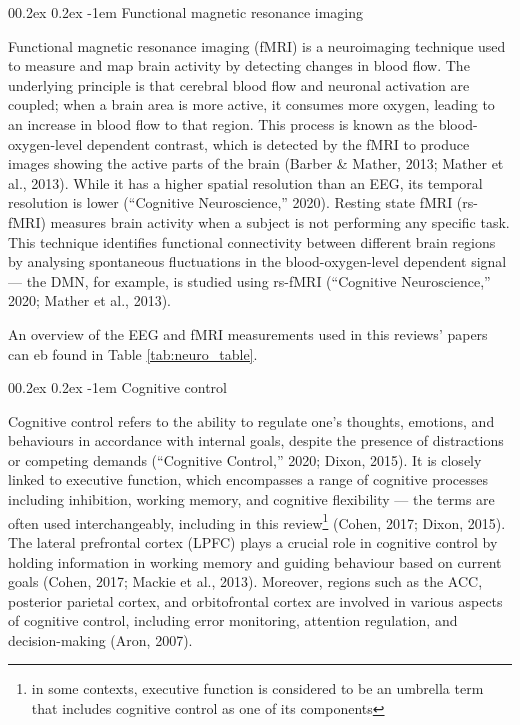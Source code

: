 \documentclass[
  stu, a4paper,floatsintext]{apa7}
\makeatletter
\let\oldparagraph\paragraph
\renewcommand{\paragraph}[1]{\oldparagraph{#1}\mbox{}}
\renewcommand{\paragraph}{\@startsection{paragraph}{4}{\parindent}%
  {0\baselineskip \@plus 0.2ex \@minus 0.2ex}%
  {-1em}%
  {\normalfont\normalsize\bfseries\itshape\typesectitle}}
\renewcommand{\paragraph}{\@startsection{paragraph}{4}{\parindent}%
  {0\baselineskip \@plus 0.2ex \@minus 0.2ex}%
  {-1em}%
  {\normalfont\normalsize\bfseries\typesectitle}}
\makeatother
\begin{document}
\paragraph{Functional magnetic resonance imaging}\label{functional-magnetic-resonance-imaging}

Functional magnetic resonance imaging (fMRI) is a neuroimaging technique used to measure and map brain activity by detecting changes in blood flow.
The underlying principle is that cerebral blood flow and neuronal activation are coupled; when a brain area is more active, it consumes more oxygen, leading to an increase in blood flow to that region.
This process is known as the blood-oxygen-level dependent contrast, which is detected by the fMRI to produce images showing the active parts of the brain (Barber \& Mather, 2013; Mather et al., 2013).
While it has a higher spatial resolution than an EEG, its temporal resolution is lower ({``Cognitive Neuroscience,''} 2020).
Resting state fMRI (rs-fMRI) measures brain activity when a subject is not performing any specific task.
This technique identifies functional connectivity between different brain regions by analysing spontaneous fluctuations in the blood-oxygen-level dependent signal --- the DMN, for example, is studied using rs-fMRI ({``Cognitive Neuroscience,''} 2020; Mather et al., 2013).

An overview of the EEG and fMRI measurements used in this reviews' papers can eb found in Table \ref{tab:neuro_table}.

\paragraph{Cognitive control}\label{cognitive-control}

Cognitive control refers to the ability to regulate one's thoughts, emotions, and behaviours in accordance with internal goals, despite the presence of distractions or competing demands ({``Cognitive Control,''} 2020; Dixon, 2015).
It is closely linked to executive function, which encompasses a range of cognitive processes including inhibition, working memory, and cognitive flexibility --- the terms are often used interchangeably, including in this review\footnote{in some contexts, executive function is considered to be an umbrella term that includes cognitive control as one of its components} (Cohen, 2017; Dixon, 2015).
The lateral prefrontal cortex (LPFC) plays a crucial role in cognitive control by holding information in working memory and guiding behaviour based on current goals (Cohen, 2017; Mackie et al., 2013).
Moreover, regions such as the ACC, posterior parietal cortex, and orbitofrontal cortex are involved in various aspects of cognitive control, including error monitoring, attention regulation, and decision-making (Aron, 2007).
\end{document}
